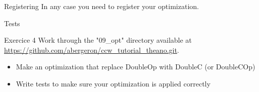 \documentclass[utf8x]{beamer}
\begin{document}
\begin{frame}{Registering}
In any case you need to register your optimization.


\end{frame}

\begin{frame}{Tests}

\end{frame}

\begin{frame}{Exercice 4}
Work through the "09\_opt" directory available at \url{https://github.com/abergeron/ccw_tutorial_theano.git}.
\begin{itemize}
\item Make an optimization that replace DoubleOp with DoubleC (or DoubleCOp)
\item Write tests to make sure your optimization is applied correctly
\end{itemize}
\end{frame}
\end{document}
